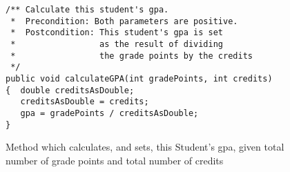 




\begin {figure}

\begin {verbatim}
/** Calculate this student's gpa.
 *  Precondition: Both parameters are positive.
 *  Postcondition: This student's gpa is set
 *                 as the result of dividing
 *                 the grade points by the credits
 */
public void calculateGPA(int gradePoints, int credits)
{  double creditsAsDouble;
   creditsAsDouble = credits;
   gpa = gradePoints / creditsAsDouble;
}
\end{verbatim}

\caption {Method which calculates, and sets,
this Student's gpa, given total number of
grade points and total number of credits}
\label {fig:method}

\end {figure}


